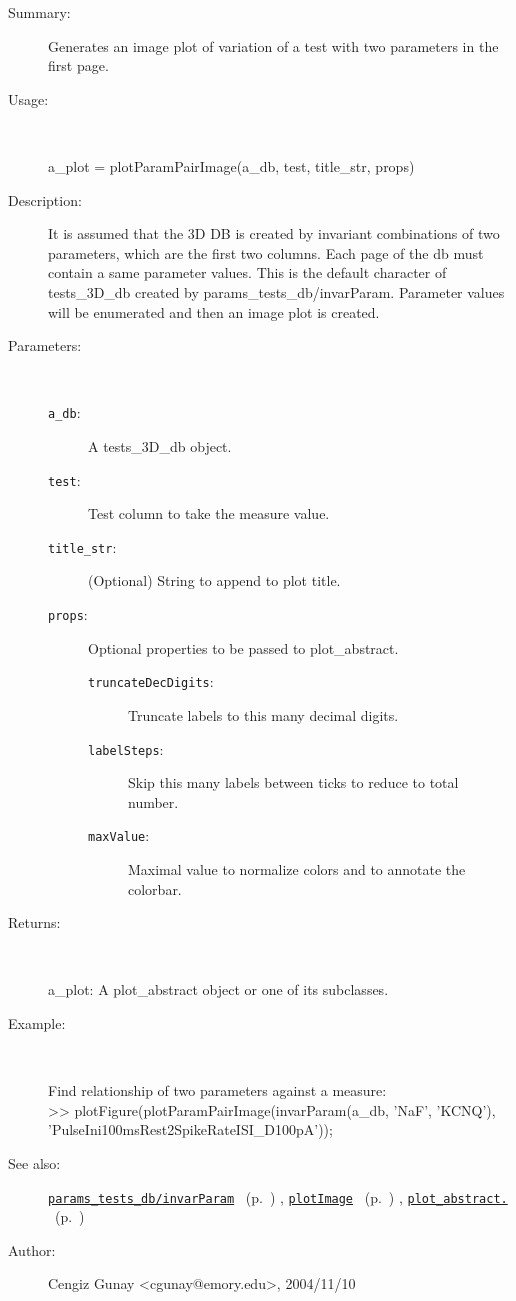\begin{description}
\item[Summary:]Generates an image plot of variation of a test with two parameters in the first page.
%
\item[Usage:]~%
\begin{lyxcode}%
a\_plot = plotParamPairImage(a\_db, test, title\_str, props)
%
\end{lyxcode}%
%
\item[Description:]%
It is assumed that the 3D DB is created by invariant combinations of two parameters,
 which are the first two columns. Each page of the db must contain a same parameter 
 values. This is the default character of tests\_3D\_db created by 
 params\_tests\_db/invarParam. Parameter values will be enumerated and then an 
 image plot is created.
\item[Parameters:]~
\begin{description}%
\item[\texttt{a\_db}:]
 A tests\_3D\_db object.
\item[\texttt{test}:]
 Test column to take the measure value.
\item[\texttt{title\_str}:]
 (Optional) String to append to plot title.
\item[\texttt{props}:]
 Optional properties to be passed to plot\_abstract.
\begin{description}%
\item[\texttt{truncateDecDigits}:]
 Truncate labels to this many decimal digits.
\item[\texttt{labelSteps}:]
 Skip this many labels between ticks to reduce to total number.
\item[\texttt{maxValue}:]
 Maximal value to normalize colors and to annotate the colorbar.
\end{description}%
\end{description}%
%
\item[Returns:]~

	a\_plot: A plot\_abstract object or one of its subclasses.
%
\item[Example:]~
\begin{lyxcode} Find relationship of two parameters against a measure:\\%
 >> plotFigure(plotParamPairImage(invarParam(a\_db, {'NaF', 'KCNQ'}), 'PulseIni100msRest2SpikeRateISI\_D100pA'));\\%
\end{lyxcode}
%
\item[See also:]%
\hyperlink{ref_params_tests_db__invarParam}{\texttt{params\_tests\_db/invarParam}}%
\ (p.~\pageref{ref_params_tests_db__invarParam})%
%
, \hyperlink{ref_plotImage}{\texttt{plotImage}}%
\ (p.~\pageref{ref_plotImage})%
%
, \hyperlink{ref_plot_abstract.}{\texttt{plot\_abstract.}}%
\ (p.~\pageref{ref_plot_abstract.})%
%
%
\item[Author:]%
Cengiz Gunay <cgunay@emory.edu>, 2004/11/10%
\end{description}
\methodline%
